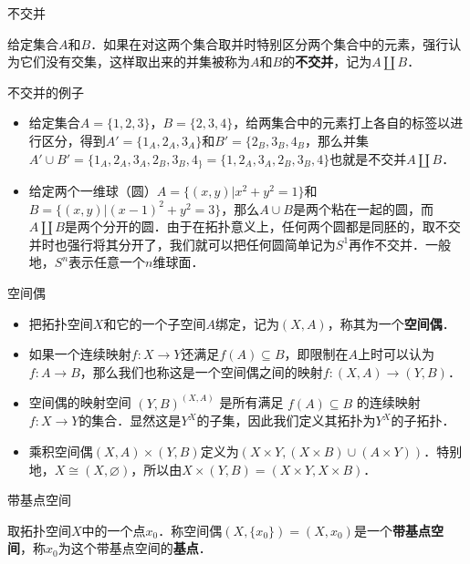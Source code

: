 
\begin{definition}{不交并}

给定集合$A$和$B$．如果在对这两个集合取并时特别区分两个集合中的元素，强行认为它们没有交集，这样取出来的并集被称为$A$和$B$的\textbf{不交并}，记为$A\amalg B$．

\end{definition}

\begin{example}{不交并的例子}
\begin{itemize}
\item 给定集合$A=\{1,2,3\}$，$B=\{2,3,4\}$，给两集合中的元素打上各自的标签以进行区分，得到$A'=\{1_A, 2_A, 3_A\}$和$B'=\{2_B, 3_B, 4_B$，那么并集$A'\cup B'=\{1_A, 2_A, 3_A, 2_B, 3_B, 4_\}=\{1, 2_A, 3_A, 2_B, 3_B, 4\}$也就是不交并$A\amalg B$．
\item 给定两个一维球（圆）$A=\{(x, y)|x^2+y^2=1\}$和$B=\{(x, y)|(x-1)^2+y^2=3\}$，那么$A\cup B$是两个粘在一起的圆，而$A\amalg B$是两个分开的圆．由于在拓扑意义上，任何两个圆都是同胚的，取不交并时也强行将其分开了，我们就可以把任何圆简单记为$S^1$再作不交并．一般地，$S^n$表示任意一个$n$维球面．

\end{itemize}
\end{example}

\begin{definition}{空间偶}
\begin{itemize}
\item 把拓扑空间$X$和它的一个子空间$A$绑定，记为$(X, A)$，称其为一个\textbf{空间偶}．
\item 如果一个连续映射$f:X\rightarrow Y$还满足$f(A)\subseteq B$，即限制在$A$上时可以认为$f:A\rightarrow B$，那么我们也称这是一个空间偶之间的映射$f:(X, A)\rightarrow(Y, B)$．
\item 空间偶的映射空间 $(Y, B)^{(X, A)}$ 是所有满足 $f(A)\subseteq B$ 的连续映射$f:X\rightarrow Y$的集合．显然这是$Y^X$的子集，因此我们定义其拓扑为$Y^X$的子拓扑．
\item 乘积空间偶$(X, A)\times(Y,B)$定义为$(X\times Y, (X\times B)\cup(A\times Y))$．特别地，$X\cong(X, \varnothing)$，所以由$X\times(Y, B)=(X\times Y, X\times B)$．


\end{itemize}
\end{definition}

\begin{definition}{带基点空间}

取拓扑空间$X$中的一个点$x_0$．称空间偶$(X, \{x_0\})=(X, x_0)$是一个\textbf{带基点空间}，称$x_0$为这个带基点空间的\textbf{基点}．

\end{definition}

